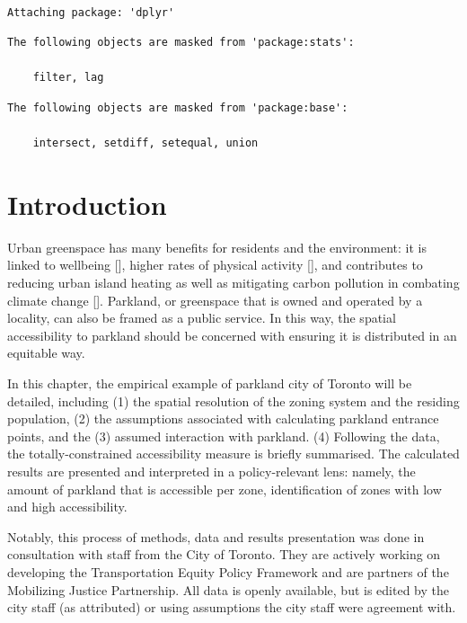 \documentclass[
11pt, %
oneside, %
english, %
singlespacing, %
]{macthesis} %
\begin{document}
\begin{verbatim}

Attaching package: 'dplyr'
\end{verbatim}

\begin{verbatim}
The following objects are masked from 'package:stats':

    filter, lag
\end{verbatim}

\begin{verbatim}
The following objects are masked from 'package:base':

    intersect, setdiff, setequal, union
\end{verbatim}

\section{Introduction}\label{introduction}

Urban greenspace has many benefits for residents and the environment: it is linked to wellbeing {[}{]}, higher rates of physical activity {[}{]}, and contributes to reducing urban island heating as well as mitigating carbon pollution in combating climate change {[}{]}. Parkland, or greenspace that is owned and operated by a locality, can also be framed as a public service. In this way, the spatial accessibility to parkland should be concerned with ensuring it is distributed in an equitable way.

In this chapter, the empirical example of parkland city of Toronto will be detailed, including (1) the spatial resolution of the zoning system and the residing population, (2) the assumptions associated with calculating parkland entrance points, and the (3) assumed interaction with parkland. (4) Following the data, the totally-constrained accessibility measure is briefly summarised. The calculated results are presented and interpreted in a policy-relevant lens: namely, the amount of parkland that is accessible per zone, identification of zones with low and high accessibility.

Notably, this process of methods, data and results presentation was done in consultation with staff from the City of Toronto. They are actively working on developing the Transportation Equity Policy Framework and are partners of the Mobilizing Justice Partnership. All data is openly available, but is edited by the city staff (as attributed) or using assumptions the city staff were agreement with.
\end{document}
